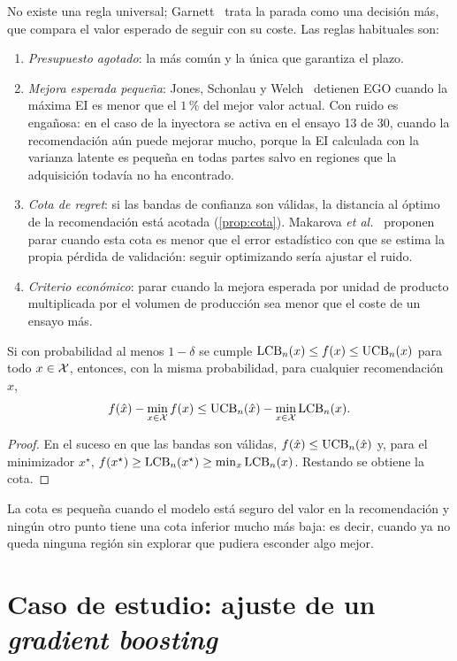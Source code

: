 No existe una regla universal; Garnett~\cite[§5.4 y §9.3]{garnett} trata la parada como una decisión más, que compara el valor esperado de seguir con su coste. Las reglas habituales son:
\begin{enumerate}
  \item \emph{Presupuesto agotado}: la más común y la única que garantiza el plazo.
  \item \emph{Mejora esperada pequeña}: Jones, Schonlau y Welch~\cite[§4.2]{jones} detienen EGO cuando la máxima EI es menor que el $1\,\%$ del mejor valor actual. Con ruido es engañosa: en el caso de la inyectora se activa en el ensayo 13 de 30, cuando la recomendación aún puede mejorar mucho, porque la EI calculada con la varianza latente es pequeña en todas partes salvo en regiones que la adquisición todavía no ha encontrado.
  \item \emph{Cota de regret}: si las bandas de confianza son válidas, la distancia al óptimo de la recomendación está acotada (\cref{prop:cota}). Makarova \emph{et al.}~\cite{makarova} proponen parar cuando esta cota es menor que el error estadístico con que se estima la propia pérdida de validación: seguir optimizando sería ajustar el ruido.
  \item \emph{Criterio económico}: parar cuando la mejora esperada por unidad de producto multiplicada por el volumen de producción sea menor que el coste de un ensayo más.
\end{enumerate}

\begin{proposicion}\label{prop:cota}
Si con probabilidad al menos $1-\delta$ se cumple $\operatorname{LCB}_n(x)\le f(x)\le\operatorname{UCB}_n(x)$ para todo $x\in\mathcal{X}$, entonces, con la misma probabilidad, para cualquier recomendación $\hat x$,
\[
f(\hat x)-\min_{x\in\mathcal{X}}f(x)\le\operatorname{UCB}_n(\hat x)-\min_{x\in\mathcal{X}}\operatorname{LCB}_n(x).
\]
\end{proposicion}

\begin{proof}
En el suceso en que las bandas son válidas, $f(\hat x)\le\operatorname{UCB}_n(\hat x)$ y, para el minimizador $x^\star$, $f(x^\star)\ge\operatorname{LCB}_n(x^\star)\ge\min_x\operatorname{LCB}_n(x)$. Restando se obtiene la cota.
\end{proof}

La cota es pequeña cuando el modelo está seguro del valor en la recomendación y ningún otro punto tiene una cota inferior mucho más baja: es decir, cuando ya no queda ninguna región sin explorar que pudiera esconder algo mejor.

\section{Caso de estudio: ajuste de un \emph{gradient boosting}}

